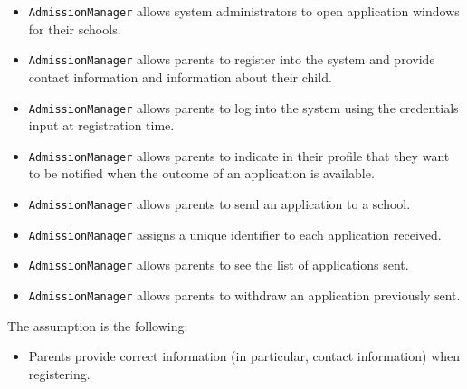 \begin{enumerate}
\begin{itemize}
            \item \texttt{AdmissionManager} allows system administrators to open application windows for their schools.
            \item \texttt{AdmissionManager} allows parents to register into the system and provide contact information and information about their child. 
            \item \texttt{AdmissionManager} allows parents to log into the system using the credentials input at registration time.
            \item \texttt{AdmissionManager} allows parents to indicate in their profile that they want to be notified when the outcome of an application is available. 
            \item \texttt{AdmissionManager} allows parents to send an application to a school. 
            \item \texttt{AdmissionManager} assigns a unique identifier to each application received. 
            \item \texttt{AdmissionManager} allows parents to see the list of applications sent.
            \item \texttt{AdmissionManager} allows parents to withdraw an application previously sent.
        \end{itemize}
        The assumption is the following: 
        \begin{itemize}
            \item Parents provide correct information (in particular, contact information) when registering.
        \end{itemize}


\end{enumerate}

